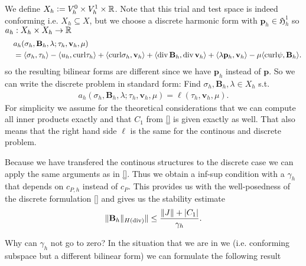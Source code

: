 \documentclass[../master_thesis.tex]{subfiles}
\begin{document}
We define $X_h \vcentcolon= V_h^0 \times V_h^1 \times \mathbb{R}$. 
Note that this trial and test space is indeed conforming i.e. $X_h \subseteq X$, 
but we choose a discrete harmonic form 
with $\mathbf{p}_h \in \mathfrak{H}^1_h$ so $a_h:X_h \times X_h \rightarrow \mathbb{R}$
\begin{align*}
    &a_h(\sigma_h,\mathbf{B}_h,\lambda;\tau_h,\mathbf{v}_h,\mu)
    \\ \quad&= \langle \sigma_h, \tau_h \rangle - \langle u_h, \mathbf{\operatorname{curl}}\tau_h \rangle
    + \langle \mathbf{\operatorname{curl}}\sigma_h, \mathbf{v}_h \rangle + \langle \operatorname{div} \mathbf{B}_h, \operatorname{div} \mathbf{v}_h \rangle 
    + \langle \lambda \mathbf{p}_h, \mathbf{v}_h \rangle - \mu \langle \mathbf{\operatorname{curl}} \psi, \mathbf{B}_h \rangle.
\end{align*}
so the resulting bilinear forms are different since we have $\mathbf{p}_h$ 
instead of $\mathbf{p}$. So we can write the discrete problem in 
standard form: Find $\sigma_h,\mathbf{B}_h,\lambda \in X_h$ s.t.
\begin{align*}
    a_h(\sigma_h,\mathbf{B}_h,\lambda;\tau_h,\mathbf{v}_h,\mu) = \ell(\tau_h,\mathbf{v}_h,\mu).
\end{align*}
For simplicity we assume for the theoretical considerations that we can 
compute all inner products exactly and that $C_1$ from \ref{} is 
given exactly as well. That also means that the right hand side $\ell$ is the 
same for the continous and discrete problem.

Because we have transfered the continous structures to the discrete case 
we can apply the same arguments as in \ref{}.
Thus we obtain a inf-sup condition with a $\gamma_h$ that depends 
on $c_{P,h}$ instead of $c_P$. This provides us with the well-posedness 
of the discrete formulation \ref{} and gives us the stability estimate
\begin{align*}
    \lVert \mathbf{B}_h \rVert_{H(\operatorname{div})} \rVert \leq \frac{\lVert J \rVert + |C_1|}{\gamma_h}.
\end{align*}

{\color{red} Why can $\gamma_h$ not go to zero?} In the situation that we are 
in we (i.e. conforming subspace but a different bilinear form) we can formulate the following result
\end{document}
